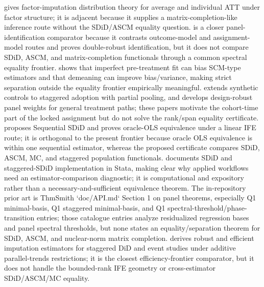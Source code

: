 \documentclass[11pt]{article}
\theoremstyle{definition}
\theoremstyle{plain}
\theoremstyle{remark}
\begin{document}
\citet{BaiNg2021} gives factor-imputation distribution theory for average and individual ATT under factor structure; it is adjacent because it supplies a matrix-completion-like inference route without the SDiD/ASCM equality question.  \citet{ArkhangelskyImbens2022} is a closer panel-identification comparator because it contrasts outcome-model and assignment-model routes and proves double-robust identification, but it does not compare SDiD, ASCM, and matrix-completion functionals through a common spectral equality frontier.  \citet{FermanPinto2021} shows that imperfect pre-treatment fit can bias SCM-type estimators and that demeaning can improve bias/variance, making strict separation outside the equality frontier empirically meaningful.  \citet{BenMichaelFellerRothstein2022} extends synthetic controls to staggered adoption with partial pooling, and \citet{ArkhangelskyImbensLeiLuo2024} develops design-robust panel weights for general treatment paths; these papers motivate the cohort-time part of the locked assignment but do not solve the rank/span equality certificate.  \citet{ArkhangelskySamkov2024} proposes Sequential SDiD and proves oracle-OLS equivalence under a linear IFE route; it is orthogonal to the present frontier because oracle OLS equivalence is within one sequential estimator, whereas the proposed certificate compares SDiD, ASCM, MC, and staggered population functionals.  \citet{ClarkePailanirAtheyImbens2024} documents SDiD and staggered-SDiD implementation in Stata, making clear why applied workflows need an estimator-comparison diagnostic; it is computational and expository rather than a necessary-and-sufficient equivalence theorem.  The in-repository prior art is ThmSmith `doc/API.md` Section 1 on panel theorems, especially Q1 minimal-basis, Q1 staggered minimal-basis, and Q1 spectral-threshold/phase-transition entries; those catalogue entries analyze residualized regression bases and panel spectral thresholds, but none states an equality/separation theorem for SDiD, ASCM, and nuclear-norm matrix completion.
\citet{BorusyakJaravelSpiess2024} derives robust and efficient imputation estimators for staggered DiD and event studies under additive parallel-trends restrictions; it is the closest efficiency-frontier comparator, but it does not handle the bounded-rank IFE geometry or cross-estimator SDiD/ASCM/MC equality.
\end{document}
